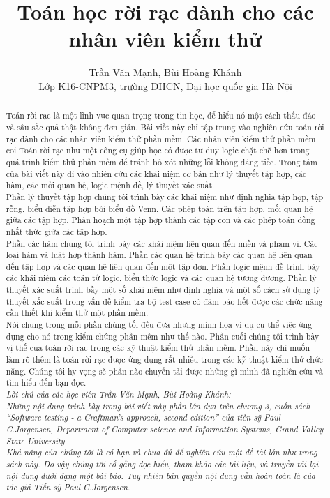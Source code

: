\documentclass[11pt,a4paper,oneside]{article}
\begin{document}
\title{Toán học rời rạc dành cho các nhân viên kiểm thử}         %
\author{
Trần Văn Mạnh, Bùi Hoàng Khánh\\
Lớp K16-CNPM3, trường ĐHCN, Đại học quốc gia Hà Nội
}        %
\date{}         %
\maketitle
\begin{abstract}
Toán rời rạc là một lĩnh vực quan trọng trong tin học, để hiểu nó một cách thấu đáo vả sâu sắc quả thật không đơn giản. Bài viết này chỉ tập trung vào nghiên cứu toán rời rạc dành cho các nhân viên kiểm thử phần mềm. Các nhân viên kiểm thử phần mềm coi Toán rời rạc như một công cụ giúp học có được tư duy logic chặt chẽ hơn trong quá trình kiểm thử phần mềm để tránh bỏ xót những lỗi không đáng tiếc.
Trong tâm của bài viết này đi vào nhiên cứu các khái niệm cơ bản như lý thuyết tập hợp, các hàm, các mối quan hệ, logic mệnh đề, lý thuyết xác suất.\\
Phần lý thuyết tập hợp chúng tôi trình bày các khái niệm như định nghĩa tập hợp, tập rỗng, biểu diễn tập hợp bởi biểu đồ Venn. Các phép toán trên tập hợp, mối quan hệ giữa các tập hợp. Phân hoạch một tập hợp thành các tập con và các phép toán đồng nhất thức giữa các tập hợp. \\
Phần các hàm chung tôi trình bày các khái niệm liên quan đến miền và phạm vi. Các loại hàm và luật hợp thành hàm. 
Phần các quan hệ trình bày các quan hệ liên quan đến tập hợp và các quan hệ liên quan đến một tập đơn.
Phần logic mệnh đề trình bày các khái niệm các toán tử logic, biểu thức logic và các quan hệ tương đương.
Phần lý thuyết xác suất trình bầy một số khái niệm như định nghĩa và một số cách sử dụng lý thuyết xắc suất trong vấn đề kiểm tra bộ test case có đảm bảo hết được các chức năng cần thiết khi kiểm thử một phần mềm.\\
Nói chung trong mỗi phần chúng tối đều đưa nhưng mình họa ví dụ cụ thể việc ứng dụng cho nó trong kiểm chứng phần mềm như thế nào.
Phần cuối chúng tôi trình bày vị thế của toán rời rạc trong các kỹ thuật kiểm thử phần mềm. Phần này chỉ muốn làm rõ thêm là toán rời rạc được ứng dụng rất nhiều trong các kỹ thuật kiểm thử chức năng. 
Chúng tôi hy vọng sẽ phần nào chuyển tải được những gì mình đã nghiên cứu và tìm hiểu đến bạn đọc. 
\\

\textit{
Lời chú của các học viên Trần Văn Mạnh, Bùi Hoàng Khánh:\\
Những nội dung trình bày trong bài viết này phần lớn dựa trên chương 3, cuốn sách ``Software testing - a Craftman's approach, second edition'' của tiến sỹ Paul C.Jorgensen, Department of Computer science and Information Systems, Grand Valley State University\\
Khả năng của chúng tôi là có hạn và chưa đủ để nghiên cứu một đề tài lớn như trong sách này. Do vậy chúng tôi cố gắng đọc hiểu, tham khảo các tải liệu, và truyền tải lại nội dung dưới dạng một bài báo. Tuy nhiên bản quyền nội dung vẫn hoàn toàn là của tác giả Tiến sỹ Paul C.Jorgensen.
} 
\end{abstract}
\end{document}
